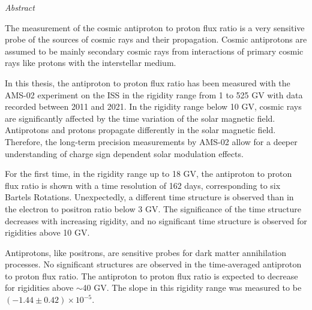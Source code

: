  
\vspace*{1.5cm}
\begin{center}
 \begin{huge}
    \textit{Abstract}
 \end{huge}
\end{center}
\begin{center}
\textbf{\normalsize{\mytitlename}}
\end{center}

The measurement of the cosmic antiproton to proton flux ratio is a very sensitive probe of the sources of cosmic rays and their propagation. Cosmic antiprotons are assumed to be mainly secondary cosmic rays from interactions of primary cosmic rays like protons with the interstellar medium.

In this thesis, the antiproton to proton flux ratio has been measured with the AMS-02 experiment on the ISS in the rigidity range from 1 to 525 GV with data recorded between 2011 and 2021. In the rigidity range below 10 GV, cosmic rays are significantly affected by the time variation of the solar magnetic field. Antiprotons and protons propagate differently in the solar magnetic field. Therefore, the long-term precision measurements by AMS-02 allow for a deeper understanding of charge sign dependent solar modulation effects.\par

For the first time, in the rigidity range up to 18 GV, the antiproton to proton flux ratio is shown with a time resolution of 162 days, corresponding to six Bartels Rotations. Unexpectedly, a different time structure is observed than in the electron to positron ratio below 3 GV. The significance of the time structure decreases with increasing rigidity, and no significant time structure is observed for rigidities above 10 GV.  \par

Antiprotons, like positrons, are sensitive probes for dark matter annihilation processes. No significant structures are observed in the time-averaged antiproton to proton flux ratio. The antiproton to proton flux ratio is expected to decrease for rigidities above $\sim$40 GV. The slope in this rigidity range was measured to be $(-1.44\pm 0.42)\times 10^{-5}$. 





